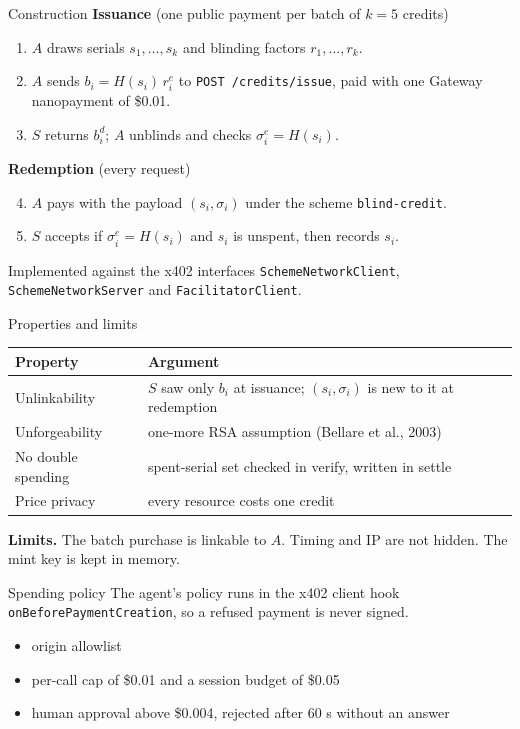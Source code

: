 \documentclass[aspectratio=169,11pt]{beamer}
\begin{document}
\begin{frame}{Construction}
  \textbf{Issuance} (one public payment per batch of $k = 5$ credits)
  \begin{enumerate}
    \item $A$ draws serials $s_1,\dots,s_k$ and blinding factors $r_1,\dots,r_k$.
    \item $A$ sends $b_i = H(s_i)\,r_i^{e}$ to \texttt{POST /credits/issue}, paid with one Gateway nanopayment of \$0.01.
    \item $S$ returns $b_i^{d}$; $A$ unblinds and checks $\sigma_i^{e} = H(s_i)$.
  \end{enumerate}
  \pause
  \textbf{Redemption} (every request)
  \begin{enumerate}
    \setcounter{enumi}{3}
    \item $A$ pays with the payload $(s_i, \sigma_i)$ under the scheme \texttt{blind-credit}.
    \item $S$ accepts if $\sigma_i^{e} = H(s_i)$ and $s_i$ is unspent, then records $s_i$.
  \end{enumerate}
  Implemented against the x402 interfaces \texttt{SchemeNetworkClient}, \texttt{SchemeNetworkServer} and \texttt{FacilitatorClient}.
\end{frame}

\begin{frame}{Properties and limits}
  \begin{tabular}{@{}ll@{}}
    \toprule
    Property & Argument \\
    \midrule
    Unlinkability & $S$ saw only $b_i$ at issuance; $(s_i,\sigma_i)$ is new to it at redemption \\
    Unforgeability & one-more RSA assumption (Bellare et al., 2003) \\
    No double spending & spent-serial set checked in verify, written in settle \\
    Price privacy & every resource costs one credit \\
    \bottomrule
  \end{tabular}
  \bigskip

  \textbf{Limits.} The batch purchase is linkable to $A$. Timing and IP are not hidden. The mint key is kept in memory.
\end{frame}

\begin{frame}{Spending policy}
  The agent's policy runs in the x402 client hook \texttt{onBeforePaymentCreation}, so a refused payment is never signed.
  \medskip
  \begin{itemize}
    \item origin allowlist
    \item per-call cap of \$0.01 and a session budget of \$0.05
    \item human approval above \$0.004, rejected after 60 s without an answer
  \end{itemize}
\end{frame}
\end{document}
